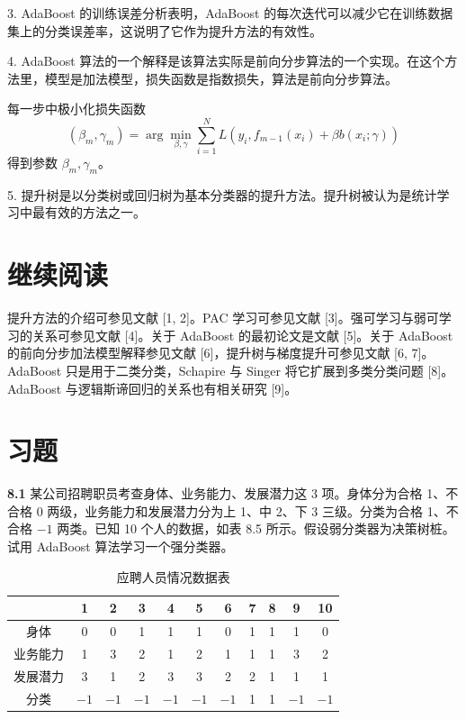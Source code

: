 \documentclass[UTF8,12pt,a4paper,fontset=fandol]{ctexart}
\begin{document}
3. AdaBoost 的训练误差分析表明，AdaBoost 的每次迭代可以减少它在训练数据集上的分类误差率，这说明了它作为提升方法的有效性。

4. AdaBoost 算法的一个解释是该算法实际是前向分步算法的一个实现。在这个方法里，模型是加法模型，损失函数是指数损失，算法是前向分步算法。

每一步中极小化损失函数
\[
(\beta_m,\gamma_m)=\arg\min_{\beta,\gamma}\sum_{i=1}^N
L(y_i,f_{m-1}(x_i)+\beta b(x_i;\gamma))
\]
得到参数 $\beta_m,\gamma_m$。

5. 提升树是以分类树或回归树为基本分类器的提升方法。提升树被认为是统计学习中最有效的方法之一。

\section*{继续阅读}

提升方法的介绍可参见文献 [1, 2]。PAC 学习可参见文献 [3]。强可学习与弱可学习的关系可参见文献 [4]。关于 AdaBoost 的最初论文是文献 [5]。关于 AdaBoost 的前向分步加法模型解释参见文献 [6]，提升树与梯度提升可参见文献 [6, 7]。AdaBoost 只是用于二类分类，Schapire 与 Singer 将它扩展到多类分类问题 [8]。AdaBoost 与逻辑斯谛回归的关系也有相关研究 [9]。

\section*{习题}

\noindent\textbf{8.1}\quad
某公司招聘职员考查身体、业务能力、发展潜力这 3 项。身体分为合格 1、不合格 0 两级，业务能力和发展潜力分为上 1、中 2、下 3 三级。分类为合格 1、不合格 $-1$ 两类。已知 10 个人的数据，如表 8.5 所示。假设弱分类器为决策树桩。试用 AdaBoost 算法学习一个强分类器。

\begin{table}[htbp]
\centering
\caption{应聘人员情况数据表}
\begin{tabular}{c*{10}{c}}
\toprule
 & 1 & 2 & 3 & 4 & 5 & 6 & 7 & 8 & 9 & 10\\
\midrule
身体 & 0 & 0 & 1 & 1 & 1 & 0 & 1 & 1 & 1 & 0\\
业务能力 & 1 & 3 & 2 & 1 & 2 & 1 & 1 & 1 & 3 & 2\\
发展潜力 & 3 & 1 & 2 & 3 & 3 & 2 & 2 & 1 & 1 & 1\\
分类 & $-1$ & $-1$ & $-1$ & $-1$ & $-1$ & $-1$ & 1 & 1 & $-1$ & $-1$\\
\bottomrule
\end{tabular}
\end{table}
\end{document}
